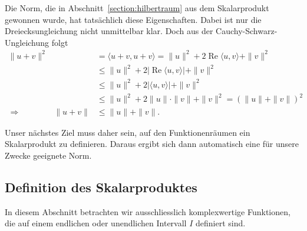 Die Norm, die in Abschnitt~\ref{section:hilbertraum} aus dem Skalarprodukt
gewonnen wurde, hat tatsächlich diese Eigenschaften.
Dabei ist nur die Dreiecksungleichung nicht unmittelbar klar.
Doch aus der Cauchy-Schwarz-Ungleichung folgt
\begin{align*}
\| u + v \|^2
&=
\langle u+v,u+v\rangle
=
\| u \|^2 + 2\operatorname{Re} \langle u,v\rangle + \| v\|^2
\\
&\le
\| u \|^2 + 2|\operatorname{Re} \langle u,v\rangle| + \| v\|^2
\\
&\le
\| u \|^2 + 2|\langle u,v\rangle| + \| v\|^2
\\
&\le
\| u \|^2 + 2\| u \| \cdot \|v\| + \| v\|^2
=
(\|u\| + \| v \|)^2
\\
\Rightarrow\qquad\qquad
\|u+v\|
&\le
\|u\| + \|v\|.
\end{align*}

Unser nächstes Ziel muss daher sein, auf den Funktionenräumen ein
Skalarprodukt zu definieren.
Daraus ergibt sich dann automatisch eine für unsere Zwecke geeignete
Norm.



\subsection{Definition des Skalarproduktes}
In diesem Abschnitt betrachten wir ausschliesslich komplexwertige Funktionen,
die auf einem endlichen oder unendlichen Intervall $I$ definiert sind.

